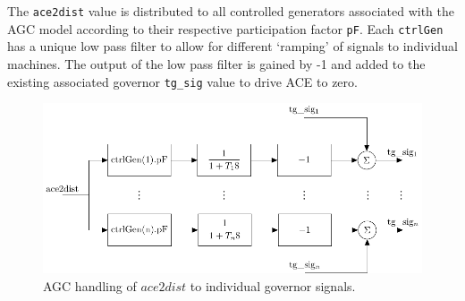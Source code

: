 The \verb|ace2dist| value is distributed to all controlled generators associated with the AGC model according to their respective participation factor \verb|pF|.
Each \verb|ctrlGen| has a unique low pass filter to allow for different `ramping' of signals to individual machines.
The output of the low pass filter is gained by -1 and added to the existing associated governor \verb|tg_sig| value to drive ACE to zero.

\begin{figure}[!h]
	\centering
	\footnotesize
	\includegraphics[width=\linewidth]{sections/agc/200722-AGCblockdiagram-p3}
	\caption{AGC handling of $ace2dist$ to individual governor signals.}
	\label{fig: agc block diagram 3}
\end{figure}%
